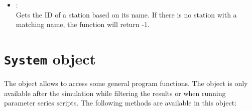\begin{itemize}

\item
{}:\\
Gets the ID of a station based on its name.
If there is no station with a matching name, the function will return -1.

\end{itemize}



\chapter{\texttt{System} object}

The  object allows to access some general program functions.
The  object is only available after the simulation while filtering the results
or when running parameter series scripts.
The following methods are available in this object:

